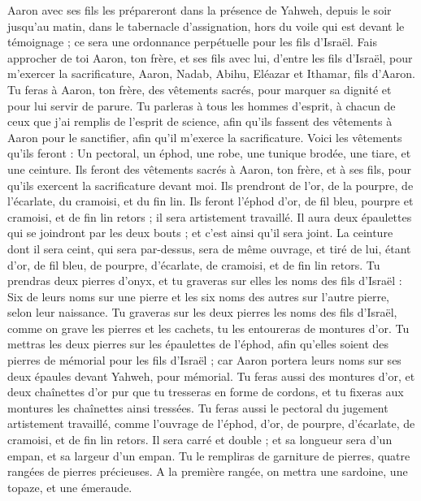 \begin{multicols}{2}
Aaron avec ses fils les prépareront dans la présence de Yahweh, depuis le soir jusqu'au matin, dans le tabernacle d'assignation, hors du voile qui est devant le témoignage ; ce sera une ordonnance perpétuelle pour les fils d'Israël.
\VerseOne{}Fais approcher de toi Aaron, ton frère, et ses fils avec lui, d'entre les fils d'Israël, pour m'exercer la sacrificature, Aaron, Nadab, Abihu, Eléazar et Ithamar, fils d'Aaron.
Tu feras à Aaron, ton frère, des vêtements sacrés, pour marquer sa dignité et pour lui servir de parure.
Tu parleras à tous les hommes d'esprit, à chacun de ceux que j'ai remplis de l'esprit de science, afin qu'ils fassent des vêtements à Aaron pour le sanctifier, afin qu'il m'exerce la sacrificature.
Voici les vêtements qu’ils feront : Un pectoral, un éphod, une robe, une tunique brodée, une tiare, et une ceinture. Ils feront des vêtements sacrés à Aaron, ton frère, et à ses fils, pour qu’ils exercent la sacrificature devant moi.
Ils prendront de l'or, de la pourpre, de l'écarlate, du cramoisi, et du fin lin.
Ils feront l’éphod d’or, de fil bleu, pourpre et cramoisi, et de fin lin retors ; il sera artistement travaillé.
Il aura deux épaulettes qui se joindront par les deux bouts ; et c’est ainsi qu’il sera joint.
La ceinture dont il sera ceint, qui sera par-dessus, sera de même ouvrage, et tiré de lui, étant d'or, de fil bleu, de pourpre, d'écarlate, de cramoisi, et de fin lin retors.
Tu prendras deux pierres d'onyx, et tu graveras sur elles les noms des fils d'Israël :
Six de leurs noms sur une pierre et les six noms des autres sur l'autre pierre, selon leur naissance.
Tu graveras sur les deux pierres les noms des fils d’Israël, comme on grave les pierres et les cachets, tu les entoureras de montures d’or.
Tu mettras les deux pierres sur les épaulettes de l'éphod, afin qu'elles soient des pierres de mémorial pour les fils d'Israël ; car Aaron portera leurs noms sur ses deux épaules devant Yahweh, pour mémorial.
Tu feras aussi des montures d'or,
et deux chaînettes d’or pur que tu tresseras en forme de cordons, et tu fixeras aux montures les chaînettes ainsi tressées.
Tu feras aussi le pectoral du jugement artistement travaillé, comme l'ouvrage de l'éphod, d'or, de pourpre, d'écarlate, de cramoisi, et de fin lin retors.
Il sera carré et double ; et sa longueur sera d’un empan, et sa largeur d'un empan.
Tu le rempliras de garniture de pierres, quatre rangées de pierres précieuses. A la première rangée, on mettra une sardoine, une topaze, et une émeraude.

\end{multicols}
